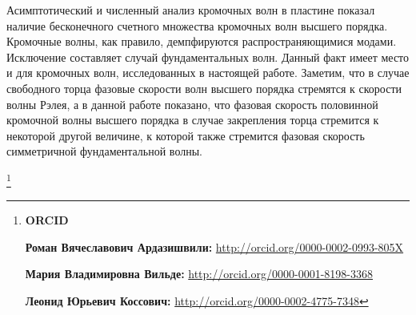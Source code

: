 Асимптотический и численный анализ кромочных волн в пластине показал наличие бесконечного счетного множества кромочных волн высшего порядка. Кромочные волны, как правило, демпфируются распространяющимися модами. Исключение составляет случай фундаментальных волн. Данный факт имеет место и для кромочных волн, исследованных в настоящей работе. Заметим, что в случае свободного торца фазовые скорости волн высшего порядка стремятся к скорости волны Рэлея, а в данной работе показано, что фазовая скорость половинной кромочной волны высшего порядка в случае закрепления торца стремится к некоторой другой величине, к которой также стремится фазовая скорость симметричной фундаментальной волны.







\pagebreak



\thanks{{\bf ORCID}



{\bf Роман Вячеславович Ардазишвили:} \url{http://orcid.org/0000-0002-0993-805X}



{\bf Мария Владимировна Вильде:} \url{http://orcid.org/0000-0001-8198-3368}



{\bf Леонид Юрьевич Коссович:} \url{http://orcid.org/0000-0002-4775-7348}



}





\RusRef



